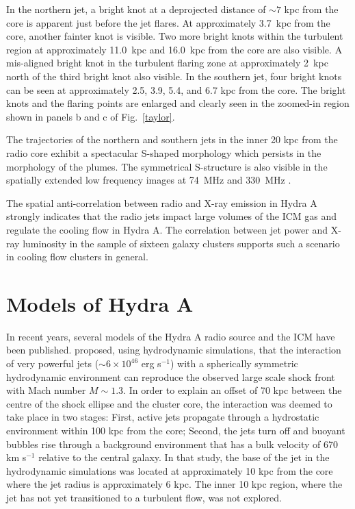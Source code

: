 In the northern jet, a bright knot at a deprojected distance of $\sim 7$ kpc from the core is apparent just before the jet flares. At approximately 3.7~kpc from the core, another fainter knot is visible. Two more bright knots within the turbulent region at approximately 11.0~kpc and 16.0~kpc from the core are also visible. A mis-aligned bright knot in the turbulent flaring zone at approximately 2~kpc north of the third bright knot also visible. In the southern jet, four bright knots can be seen at approximately 2.5, 3.9, 5.4, and 6.7 kpc from the core. The bright knots and the flaring points are enlarged and clearly seen in the zoomed-in region shown in panels b and c of Fig.~\ref{taylor}. 

The trajectories of the northern and southern jets in the inner 20 kpc from the radio core exhibit a spectacular S-shaped morphology which persists in the morphology of the plumes. The symmetrical S-structure is also visible in the spatially extended low frequency images at 74~MHz and 330~MHz \citep{lane04}. 

The spatial anti-correlation between radio and X-ray emission in Hydra A strongly indicates that the radio jets impact large volumes of the ICM gas and regulate the cooling flow in Hydra A. The correlation between jet power and X-ray luminosity in the \citet{birzan04} sample of sixteen galaxy clusters supports such a scenario in cooling flow clusters in general. 

\section{Models of Hydra A}\label{int:mod}
In recent years, several models of the Hydra A radio source and the ICM have been published. \citet{simionescu09} proposed, using hydrodynamic simulations, that the interaction of very powerful jets ($\sim6\times10^{46}$ erg s$^{-1}$) with a spherically symmetric hydrodynamic environment can reproduce the observed large scale shock front with Mach number $M \sim 1.3$. In order to explain an offset of 70 kpc between the centre of the shock ellipse and the cluster core, the interaction was deemed to take place in two stages: First, active jets propagate through a hydrostatic environment within 100 kpc from the core; Second, the jets turn off and buoyant bubbles rise through a background environment that has a bulk velocity of 670 km s$^{-1}$ relative to the central galaxy. In that study, the base of the jet in the hydrodynamic simulations was located at approximately 10 kpc from the core where the jet radius is approximately 6 kpc. The inner 10 kpc region, where the jet has not yet transitioned to a turbulent flow, was not explored. 

